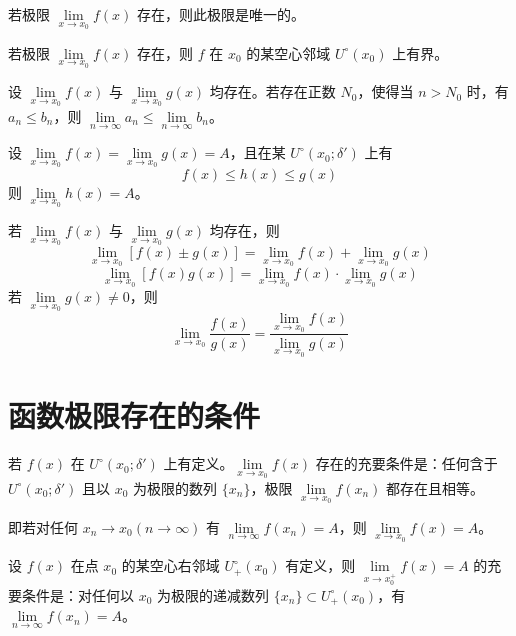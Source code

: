 \begin{theorem}[唯一性]
	若极限 $\lim\limits_{x \to x_0}f(x)$ 存在，则此极限是唯一的。
\end{theorem}

\begin{theorem}[局部有界性]
	若极限 $\lim\limits_{x \to x_0}f(x)$ 存在，则 $f$ 在 $x_0$ 的某空心邻域 $U^\circ(x_0)$ 上有界。
\end{theorem}

\begin{theorem}[局部保序性]
	设 $\lim\limits_{x \to x_0}f(x)$ 与 $\lim\limits_{x \to x_0}g(x)$ 均存在。若存在正数 $N_0$，使得当 $n>N_0$ 时，有 $a_n\leqslant b_n$，则 $\lim\limits_{n\to \infty}a_n \leqslant \lim\limits_{n\to \infty}b_n$。
\end{theorem}

\begin{theorem}[夹逼定理]
	设 $\lim\limits_{x \to x_0}f(x) = \lim\limits_{x \to x_0}g(x) = A$，且在某 $U^\circ(x_0;\delta')$ 上有
	\[ f(x)\leqslant h(x) \leqslant g(x) \]
	则 $\lim\limits_{x \to x_0}h(x) = A$。
\end{theorem}

\begin{theorem}[四则运算法则]
	若 $\lim\limits_{x \to x_0}f(x)$ 与 $\lim\limits_{x \to x_0}g(x)$ 均存在，则
	\[ \lim_{x \to x_0}[f(x)\pm g(x)] = \lim_{x \to x_0}f(x) + \lim_{x \to x_0}g(x) \]
	\[ \lim_{x \to x_0}[f(x)g(x)] = \lim_{x \to x_0}f(x) \cdot \lim_{x \to x_0}g(x) \]
	若 $\lim\limits_{x \to x_0}g(x)\ne 0$，则
	\[ \lim_{x \to x_0}\frac{f(x)}{g(x)} = \frac{\lim\limits_{x \to x_0}f(x)}{\lim\limits_{x \to x_0}g(x)} \]
\end{theorem}

\section{函数极限存在的条件}

\begin{theorem}[海涅 Heine 定理]
	若 $f(x)$ 在 $U^\circ(x_0;\delta')$ 上有定义。$\lim\limits_{x \to x_0}f(x)$ 存在的充要条件是：任何含于 $U^\circ(x_0;\delta')$ 且以 $x_0$ 为极限的数列 $\{x_n\}$，极限 $\lim\limits_{x \to x_0}f(x_n)$ 都存在且相等。
\end{theorem}

即若对任何 $x_n\to x_0(n\to \infty)$ 有 $\lim\limits_{n\to \infty}f(x_n) = A$，则 $\lim\limits_{x \to x_0}f(x)=A$。

\begin{theorem}
	设 $f(x)$ 在点 $x_0$ 的某空心右邻域 $U_+^\circ(x_0)$ 有定义，则 $\lim\limits_{x \to x_0^+}f(x)=A$ 的充要条件是：对任何以 $x_0$ 为极限的递减数列 $\{x_n\}\subset U_+^\circ(x_0)$，有 $\lim\limits_{n\to \infty}f(x_n) = A$。
\end{theorem}

